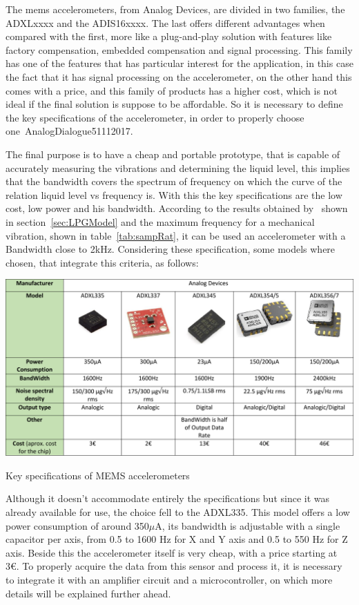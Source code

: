 The \acrshort{mems} accelerometers, from Analog Devices, are divided in two families, the ADXLxxxx and the ADIS16xxxx. The last offers different advantages when compared with the first, more like a plug-and-play solution with features like factory compensation, embedded compensation and signal processing. This family has one of the features that has particular interest for the application, in this case the fact that it has signal processing on the accelerometer, on the other hand this comes with a price, and this family of products has a higher cost, which is not ideal if the final solution is suppose to be affordable. So it is necessary to define the key specifications of the accelerometer, in order to properly choose one~\cite{AnalogDialogue51102017}{AnalogDialogue51112017}.

The final purpose is to have a cheap and portable prototype, that is capable of accurately measuring the vibrations and determining the liquid level, this implies that the bandwidth covers the spectrum of frequency on which the curve of the relation liquid level vs frequency is. With this the key specifications are the low cost, low power and his bandwidth. According to the results obtained by~\citeauthor{wuLiquidLevelDetector2014b}\cite{wuLiquidLevelDetector2014b} shown in section~\ref{sec:LPGModel} and the maximum frequency for a mechanical vibration, shown in table~\ref{tab:sampRat}, it can be used an accelerometer with a Bandwidth close to 2kHz. Considering these specification, some models where chosen, that integrate this criteria, as follows:
\begin{table}
    \centering
    \includegraphics[width=1\textwidth]{Chapters/4CHP/Figures/accTable.pdf}
    \caption{Key specifications of MEMS accelerometers}
    \label{tab:acctable}
\end{table}
Although it doesn't accommodate entirely the specifications but since it was already available for use, the choice fell to the ADXL335. This model offers a low power consumption of around 350$\mu$A, its bandwidth is adjustable with a single capacitor per axis, from 0.5 to 1600 Hz for X and Y axis and 0.5 to 550 Hz for Z axis. Beside this the accelerometer itself is very cheap, with a price starting at 3€. To properly acquire the data from this sensor and process it, it is necessary to integrate it with an amplifier circuit and a microcontroller, on which more details will be explained further ahead.
